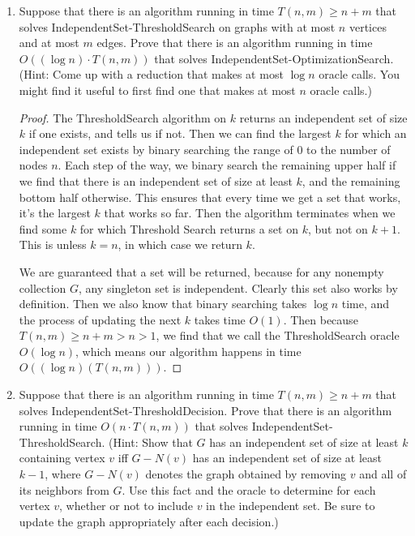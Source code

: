 \documentclass[11pt]{article}
\begin{document}
\begin{enumerate}
\begin{enumerate}
 \item Suppose that there is an algorithm running in time $T(n,m)\geq n+m$ that solves IndependentSet-ThresholdSearch on graphs with at most $n$ vertices and at most $m$ edges.  Prove that there is an algorithm running in time $O((\log n)\cdot T(n,m))$ that solves IndependentSet-OptimizationSearch.  (Hint: Come up with a reduction that makes at most $\log n$ oracle calls.  You might find it useful to first find one that makes at most $n$ oracle calls.)
 
\begin{proof}
The ThresholdSearch algorithm on $k$ returns an independent set of size $k$ if one exists, and tells us if not. Then we can find the largest $k$ for which an independent set exists by binary searching the range of $0$ to the number of nodes $n$. Each step of the way, we binary search the remaining upper half if we find that there is an independent set of size at least $k$, and the remaining bottom half otherwise. This ensures that every time we get a set that works, it's the largest $k$ that works so far. Then the algorithm terminates when we find some $k$ for which Threshold Search returns a set on $k$, but not on $k + 1$. This is unless $k = n$, in which case we return $k$.

We are guaranteed that a set will be returned, because for any nonempty collection $G$, any singleton set is independent. Clearly this set also works by definition. Then we also know that binary searching takes $\log n$ time, and the process of updating the next $k$ takes time $O(1)$. Then because $T(n, m) \geq n + m > n > 1$, we find that we call the ThresholdSearch oracle $O(\log n)$, which means our algorithm happens in time $O((\log n) (T(n, m)))$.
\end{proof}

  \item Suppose that there is an algorithm 
 running in time $T(n,m)\geq n+m$ that solves IndependentSet-ThresholdDecision.   Prove that there is an algorithm running in time $O(n\cdot T(n,m))$ that solves IndependentSet-ThresholdSearch.
(Hint: Show that $G$ has an independent set of size at least $k$ containing vertex $v$ iff $G-N(v)$ has an independent set of size at least $k-1$, where $G-N(v)$ denotes the graph obtained by removing $v$ and all of its neighbors from $G$.  Use this fact and the oracle to determine for each vertex $v$, whether or not to include $v$ in the independent set.  Be sure to update the graph appropriately after each decision.)


\end{enumerate}
\end{enumerate}
\end{document}
